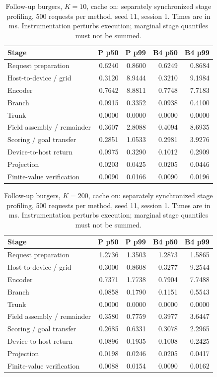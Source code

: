 \begin{table}[ht]
\centering\small
\caption{Follow-up burgers, $K=10$, cache on: separately synchronized stage profiling, 500 requests per method, seed 11, session 1. Times are in ms. Instrumentation perturbs execution; marginal stage quantiles must not be summed.}\label{tab:e2_profile_burgers_10_on}
\begin{tabular}{@{}lrrrr@{}}\toprule
Stage & P p50 & P p99 & B4 p50 & B4 p99\\\midrule
Request preparation & 0.6240 & 0.8600 & 0.6249 & 0.8684\\
Host-to-device / grid & 0.3120 & 8.9444 & 0.3210 & 9.1984\\
Encoder & 0.7642 & 8.8811 & 0.7748 & 7.7183\\
Branch & 0.0915 & 0.3352 & 0.0938 & 0.4100\\
Trunk & 0.0000 & 0.0000 & 0.0000 & 0.0000\\
Field assembly / remainder & 0.3607 & 2.8088 & 0.4094 & 8.6935\\
Scoring / goal transfer & 0.2851 & 1.0533 & 0.2981 & 3.9276\\
Device-to-host return & 0.0975 & 0.3290 & 0.1012 & 0.2909\\
Projection & 0.0203 & 0.0425 & 0.0205 & 0.0446\\
Finite-value verification & 0.0090 & 0.0166 & 0.0090 & 0.0196\\
\bottomrule\end{tabular}
\end{table}

\begin{table}[ht]
\centering\small
\caption{Follow-up burgers, $K=200$, cache on: separately synchronized stage profiling, 500 requests per method, seed 11, session 1. Times are in ms. Instrumentation perturbs execution; marginal stage quantiles must not be summed.}\label{tab:e2_profile_burgers_200_on}
\begin{tabular}{@{}lrrrr@{}}\toprule
Stage & P p50 & P p99 & B4 p50 & B4 p99\\\midrule
Request preparation & 1.2736 & 1.3503 & 1.2873 & 1.5865\\
Host-to-device / grid & 0.3000 & 0.8608 & 0.3277 & 9.2544\\
Encoder & 0.7371 & 1.7738 & 0.7904 & 7.7488\\
Branch & 0.0858 & 0.1790 & 0.1151 & 0.5543\\
Trunk & 0.0000 & 0.0000 & 0.0000 & 0.0000\\
Field assembly / remainder & 0.3580 & 0.7759 & 0.3977 & 3.6447\\
Scoring / goal transfer & 0.2685 & 0.6331 & 0.3078 & 2.2965\\
Device-to-host return & 0.0896 & 0.1935 & 0.1008 & 0.2425\\
Projection & 0.0198 & 0.0246 & 0.0205 & 0.0417\\
Finite-value verification & 0.0088 & 0.0154 & 0.0090 & 0.0162\\
\bottomrule\end{tabular}
\end{table}

